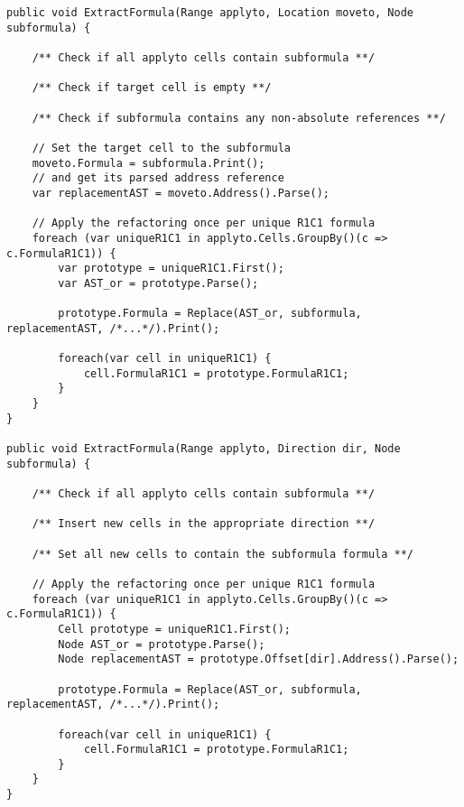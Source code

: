 \lstset{style=sharpc}
\begin{lstlisting}[float,caption={Extract formula refactoring (simplified)}, label={lst:extractformula}]
public void ExtractFormula(Range applyto, Location moveto, Node subformula) {
	
	/** Check if all applyto cells contain subformula **/
	
	/** Check if target cell is empty **/
	
	/** Check if subformula contains any non-absolute references **/
	
	// Set the target cell to the subformula
	moveto.Formula = subformula.Print();
	// and get its parsed address reference
	var replacementAST = moveto.Address().Parse();
	
	// Apply the refactoring once per unique R1C1 formula
	foreach (var uniqueR1C1 in applyto.Cells.GroupBy()(c => c.FormulaR1C1)) {
		var prototype = uniqueR1C1.First();
		var AST_or = prototype.Parse();
		
		prototype.Formula = Replace(AST_or, subformula, replacementAST, /*...*/).Print();
		
		foreach(var cell in uniqueR1C1) {
			cell.FormulaR1C1 = prototype.FormulaR1C1;
		}
	}
}

public void ExtractFormula(Range applyto, Direction dir, Node subformula) {
	
	/** Check if all applyto cells contain subformula **/
	
	/** Insert new cells in the appropriate direction **/
	
	/** Set all new cells to contain the subformula formula **/
	
	// Apply the refactoring once per unique R1C1 formula
	foreach (var uniqueR1C1 in applyto.Cells.GroupBy()(c => c.FormulaR1C1)) {
		Cell prototype = uniqueR1C1.First();
		Node AST_or = prototype.Parse();
		Node replacementAST = prototype.Offset[dir].Address().Parse();
		
		prototype.Formula = Replace(AST_or, subformula, replacementAST, /*...*/).Print();

		foreach(var cell in uniqueR1C1) {
			cell.FormulaR1C1 = prototype.FormulaR1C1;
		}
	}
}
\end{lstlisting}

